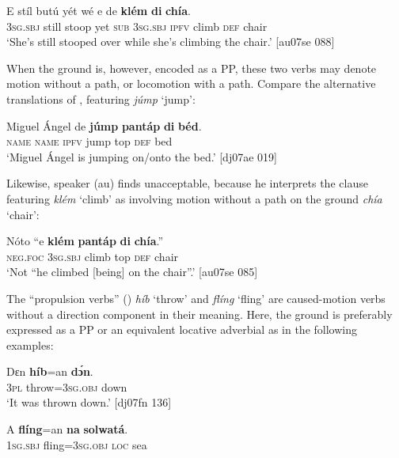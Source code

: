 \ea%
    \label{ex:key:963}
    \gll E    stíl  butú  yét  wé  e    de  \textbf{klém}  \textbf{di}  \textbf{chía}.\\
\textsc{3sg.sbj}  still  stoop  yet  \textsc{sub}  \textsc{3sg.sbj}  \textsc{ipfv}  climb  \textsc{def}  chair\\

\glt ‘She’s still stooped over while she’s climbing the chair.’ [au07se 088]
\z

When the ground is, however, encoded as a PP, these two verbs may denote motion without a path, or locomotion with a path. Compare the alternative translations of , featuring \textit{júmp} ‘jump’: 


\ea%
    \label{ex:key:964}
    \gll Miguel  Ángel  de  \textbf{júmp}  \textbf{pantáp}  \textbf{di}  \textbf{béd}.\\
\textsc{name}  \textsc{name}  \textsc{ipfv}  jump  top    \textsc{def}  bed\\

\glt ‘Miguel Ángel is jumping on/onto the bed.’ [dj07ae 019]
\z

Likewise, speaker (au) finds  unacceptable, because he interprets the clause featuring \textit{klém} ‘climb’ as involving motion without a path on the ground\textit{ chía} ‘chair’:


\ea%
    \label{ex:key:965}
    \gll Nóto  “e    \textbf{klém}  \textbf{pantáp}  \textbf{di}  \textbf{chía}.”\\
\textsc{neg}.\textsc{foc}  \textsc{3sg.sbj}  climb  top    \textsc{def}  chair\\

\glt ‘Not “he climbed [being] on the chair”.’ [au07se 085]
\z

The “propulsion verbs” (\citealt[200]{Longacre1996}) \textit{híb} ‘throw’ and \textit{flíng} ‘fling’ are caused-motion verbs without a direction component in their meaning. Here, the ground is preferably expressed as a PP or an equivalent locative adverbial as in the following examples: 


\ea%
    \label{ex:key:966}
    \gll Dɛn  \textbf{híb}=an    \textbf{dɔ́n}.\\
\textsc{3pl}  throw=\textsc{3sg.obj}  down\\

\glt ‘It was thrown down.’ [dj07fn 136]
\z


\ea%
    \label{ex:key:967}
    \gll A    \textbf{flíng}=an    \textbf{na}  \textbf{solwatá}.\\
\textsc{1sg.sbj}  fling=\textsc{3sg.obj}  \textsc{loc}  sea\\

